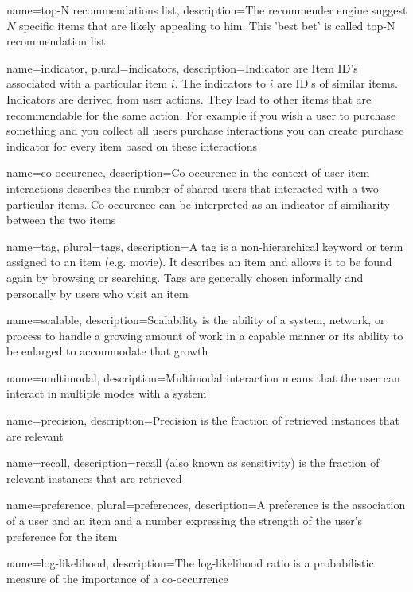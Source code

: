 {
name=top-N recommendations list,
description={The recommender engine suggest $N$ specific items that are likely appealing to him. This 'best bet' is called top-N recommendation list}
}

{
name={indicator},
plural={indicators},
description={Indicator are Item ID's associated with a particular item $i$. The indicators to $i$ are  ID's of similar items. Indicators are derived from user actions. They lead to other items that are recommendable for the same action. For example if you wish a user to purchase something and you collect all users purchase interactions you can create purchase indicator for every item based on these interactions}
}

{
name={co-occurence},
description={Co-occurence in the context of user-item interactions describes the number of shared users that interacted with a two particular items. Co-occurence can be interpreted as an indicator of similiarity between the two items}
}

{
name={tag},
plural={tags},
description={A tag is a non-hierarchical keyword or term assigned to an item (e.g. movie). It describes an item and allows it to be found again by browsing or searching. Tags are generally chosen informally and personally by users who visit an item}
}

{
name={scalable},
description={Scalability is the ability of a system, network, or process to handle a growing amount of work in a capable manner or its ability to be enlarged to accommodate that growth}
}

{
name={multimodal},
description={Multimodal interaction means that the user can interact in multiple modes with a system}
}

{
name={precision},
description={Precision is the fraction of retrieved instances that are relevant}
}

{
name={recall},
description={recall (also known as sensitivity) is the fraction of relevant instances that are retrieve}d 
}

{
name={preference},
plural={preferences},
description={A preference is the association of a user and an item and a number expressing the strength of the user's preference for the item}
}

{
name={log-likelihood},
description={The log-likelihood ratio is a probabilistic measure of the importance of a co-occurrence}
}

